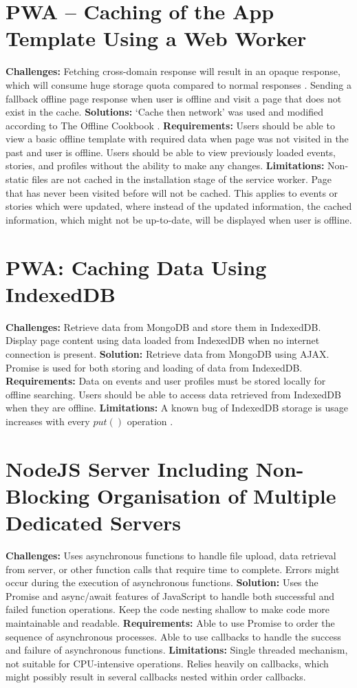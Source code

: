 \documentclass[11pt, a4paper]{article}
\begin{document}
\section{PWA – Caching of the App Template Using a Web Worker}
\textbf{Challenges:} Fetching cross-domain response will result in an opaque response, which will
consume huge storage quota compared to normal responses \cite{opaque_workbox}. Sending a fallback
offline page response when user is offline and visit a page that does not exist in the cache.
\textbf{Solutions:} `Cache then network' was used and modified according to The Offline Cookbook
\cite{offline_cookbook}. \textbf{Requirements:} Users should be able to view a basic offline
template with required data when page was not visited in the past and user is offline. Users should
be able to view previously loaded events, stories, and profiles without the ability to make any
changes. \textbf{Limitations:} Non-static files are not cached in the installation stage
of the service worker. Page that has never been visited before will not be cached. This applies to
events or stories which were updated, where instead of the updated information, the cached
information, which might not be up-to-date, will be displayed when user is offline.

\section{PWA: Caching Data Using IndexedDB}
\textbf{Challenges:} Retrieve data from MongoDB and store them in IndexedDB. Display page content
using data loaded from IndexedDB when no internet connection is present. \textbf{Solution:} Retrieve
data from MongoDB using AJAX. Promise is used for both storing and loading of data from IndexedDB.
\textbf{Requirements:} Data on events and user profiles must be stored locally for offline searching.
Users should be able to access data retrieved from IndexedDB when they are offline.
\textbf{Limitations:} A known bug of IndexedDB storage is usage increases with every $put()$
operation \cite{leveldb_593, leveldb_603}.

\section{NodeJS Server Including Non-Blocking Organisation of Multiple Dedicated Servers}
\textbf{Challenges:} Uses asynchronous functions to handle file upload, data retrieval from server,
or other function calls that require time to complete. Errors might occur during the execution
of asynchronous functions. \textbf{Solution:} Uses the Promise and async/await features of
JavaScript to handle both successful and failed function operations. Keep the code nesting shallow
to make code more maintainable and readable. \textbf{Requirements:} Able to use Promise to order the
sequence of asynchronous processes. Able to use callbacks to handle the success and failure of
asynchronous functions. \textbf{Limitations:} Single threaded mechanism, not suitable for
CPU-intensive operations. Relies heavily on callbacks, which might possibly result in several
callbacks nested within order callbacks.
\end{document}
